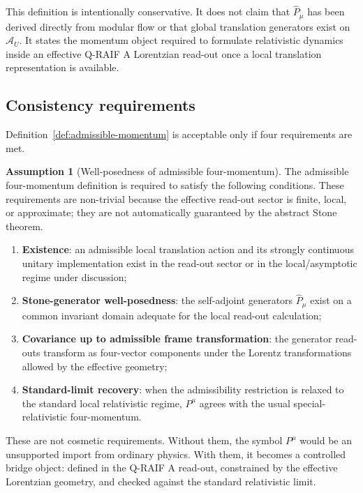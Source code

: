 \documentclass[12pt,a4paper]{article}
\theoremstyle{definition}
\newtheorem{assumption}[theorem]{Assumption}
\theoremstyle{remark}
\newcommand{\AU}{\mathcal{A}_U}
\begin{document}
This definition is intentionally conservative. It does not claim that $\hat P_\mu$ has been derived directly from modular flow or that global translation generators exist on $\AU$. It states the momentum object required to formulate relativistic dynamics inside an effective Q-RAIF A Lorentzian read-out once a local translation representation is available.

\subsection{Consistency requirements}

Definition~\ref{def:admissible-momentum} is acceptable only if four requirements are met.

\begin{assumption}[Well-posedness of admissible four-momentum]
\label{ass:well-posed}
The admissible four-momentum definition is required to satisfy the following conditions. These requirements are non-trivial because the effective read-out sector is finite, local, or approximate; they are not automatically guaranteed by the abstract Stone theorem.
\begin{enumerate}[label=(\alph*), leftmargin=*]
\item \textbf{Existence}: an admissible local translation action and its strongly continuous unitary implementation exist in the read-out sector or in the local/asymptotic regime under discussion;
\item \textbf{Stone-generator well-posedness}: the self-adjoint generators $\hat P_\mu$ exist on a common invariant domain adequate for the local read-out calculation;
\item \textbf{Covariance up to admissible frame transformation}: the generator read-outs transform as four-vector components under the Lorentz transformations allowed by the effective geometry;
\item \textbf{Standard-limit recovery}: when the admissibility restriction is relaxed to the standard local relativistic regime, $P^\mu$ agrees with the usual special-relativistic four-momentum.
\end{enumerate}
\end{assumption}

These are not cosmetic requirements. Without them, the symbol $P^\mu$ would be an unsupported import from ordinary physics. With them, it becomes a controlled bridge object: defined in the Q-RAIF A read-out, constrained by the effective Lorentzian geometry, and checked against the standard relativistic limit.
\end{document}
